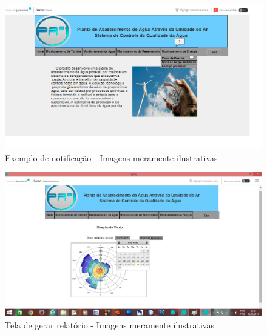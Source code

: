 \begin{center}
\begin{figure}[!ht]
\centering
\includegraphics[scale=0.3]{figuras/exemplo_notificacao}
\caption[Exemplo de notificação]{Exemplo de notificação - Imagens meramente ilustrativas}
\label{tela_notificacao}
\end{figure}

\clearpage
\begin{figure}[!ht]
\centering
\includegraphics[scale=0.4]{figuras/gerar_relatorio_por_data}
\caption[Tela de gerar relatório]{Tela de gerar relatório - Imagens meramente ilustrativas}
\label{gerar_relatorio}
\end{figure}

\clearpage

\end{center}
